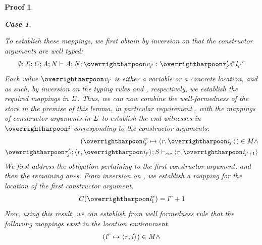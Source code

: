 \documentclass[showabstract,showacknowledgments,showpreface,showdedication]{iuphd}
\newtheorem*{bcase}{Case}
\theoremstyle{nonumberplain}
\newtheorem{nproof}{Proof}
\begin{document}
\begin{nproof}
\begin{bcase}
\begin{itemize}
\begin{itemize}
\begin{itemize}
           To establish these mappings, we first 
           obtain by inversion on \tdatacon{} that the
           constructor arguments are well typed:
           \begin{align*}
           \emptytenv;\SENV;\CENV;\AENV;\NENV \vdash \AENV;\NENV;\overharpoon{\VAL_{\indj'}} : \overharpoon{\tyatlocreg{\TYP_{\indj'}'}{\loc_{\indj'}}{\reg}}
           \end{align*}
           Each value $\overharpoon{\VAL_{\indj'}}$ is either a variable or a concrete location, and
           as such, by inversion on the typing rules \tvar{} and \tconcreteloc{}, respectively,
           we establish the required mappings in $\mathit{\Sigma}$.
           Thus, we can now combine the well-formedness
           of the store in the premise of this lemma,
           in particular requirement ,
           with the mappings of constructor arguments in $\mathit{\Sigma}$ to establish
           the end witnesses in $\overharpoon{\ind}$ corresponding to the constructor arguments:
           \begin{align} 
           (\overharpoon{\locreg{\loc}{\reg}_{\indj'}} \mapsto \concreteloc{\reg}{\overharpoon{\ind_{\indj'}}}{}) \in \MENV \wedge \label{prf:dc-ew1} \\
           \ewitness{\overharpoon{\TYP_{\indj'}'}}{\concreteloc{\reg}{\overharpoon{\ind_{\indj'}}}{}}{\STOR}{\concreteloc{\reg}{\overharpoon{\ind_{\indj' + 1}}}{}} \label{prf:dc-ew2}
           \end{align}
           We first address the obligation pertaining to the first constructor argument,
           and then the remaining ones.
           From inversion on \tdatacon{}, we establish a mapping for the location of the
           first constructor argument.
           \begin{align*}
           \CENV(\overharpoon{\locreg{\loc}{\reg}_1}) = \locreg{\loc}{\reg} + 1
           \end{align*}
           Now, using this result, we can establish from well
           formedness rule 
           that the following mappings exist in the location environment.
           \begin{align*}
           (\locreg{\loc}{\reg} \mapsto \concreteloc{\reg}{\ind}{})  \in \MENV \wedge \\

\end{align*}
\end{itemize}
\end{itemize}
\end{itemize}
\end{bcase}
\end{nproof}
\end{document}
